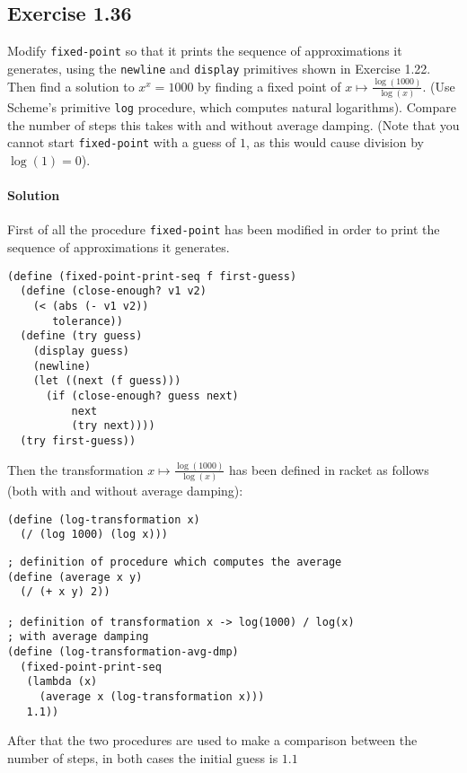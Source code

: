 \subsection*{Exercise 1.36}
Modify \texttt{fixed-point} so that it prints the sequence of approximations it generates, using the \texttt{newline} and 
\texttt{display} primitives shown in Exercise 1.22. Then find a solution to $ x^{x} = 1000 $ by finding a fixed point of
$ x \mapsto \frac{\log(1000)}{\log(x)} $.
(Use Scheme's primitive \texttt{log} procedure, which computes natural logarithms).
Compare the number of steps this takes with and without average damping.
(Note that you cannot start \texttt{fixed-point} with a guess of $ 1 $, as this would cause division by $ \log(1) = 0 $).

\paragraph{Solution} 
First of all the procedure \texttt{fixed-point} has been modified in order to print the sequence of approximations it generates.
\begin{lstlisting}[caption={Procedure \texttt{fixed-point} which prints the sequence of approximations it generates},captionpos=b]
(define (fixed-point-print-seq f first-guess)
  (define (close-enough? v1 v2)
    (< (abs (- v1 v2))
       tolerance))
  (define (try guess)
    (display guess)
    (newline)
    (let ((next (f guess)))
      (if (close-enough? guess next)
          next
          (try next))))
  (try first-guess))
\end{lstlisting}
Then the transformation $ x \mapsto \frac{\log(1000)}{\log(x)} $ has been defined in racket as follows 
(both with and without average damping):
\begin{lstlisting}[caption={Transformation without average-damping},captionpos=b]
(define (log-transformation x)
  (/ (log 1000) (log x)))
\end{lstlisting}
\begin{lstlisting}[caption={Transformation with average damping},captionpos=b]
; definition of procedure which computes the average
(define (average x y) 
  (/ (+ x y) 2))

; definition of transformation x -> log(1000) / log(x) 
; with average damping
(define (log-transformation-avg-dmp)
  (fixed-point-print-seq
   (lambda (x)
     (average x (log-transformation x)))
   1.1))
\end{lstlisting}
After that the two procedures are used to make a comparison between the number of steps, in both cases the initial guess is $ 1.1 $
